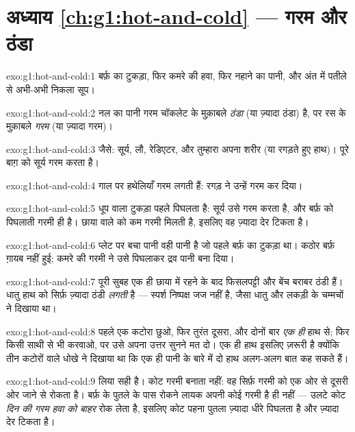 \section*{अध्याय \ref{ch:g1:hot-and-cold} --- गरम और ठंडा}

\begin{solution}{exo:g1:hot-and-cold:1}
बर्फ़ का टुकड़ा, फिर कमरे की हवा, फिर नहाने का पानी, और अंत में पतीले
से अभी-अभी निकला सूप।
\end{solution}

\begin{solution}{exo:g1:hot-and-cold:2}
नल का पानी गरम चॉकलेट के मुक़ाबले \emph{ठंडा} (या ज़्यादा ठंडा) है,
पर रस के मुक़ाबले \emph{गरम} (या ज़्यादा गरम)।
\end{solution}

\begin{solution}{exo:g1:hot-and-cold:3}
जैसे: सूर्य, लौ, रेडिएटर, और तुम्हारा अपना शरीर (या रगड़ते हुए हाथ)।
पूरे बाग़ को सूर्य गरम करता है।
\end{solution}

\begin{solution}{exo:g1:hot-and-cold:4}
गाल पर हथेलियाँ गरम लगती हैं: रगड़ ने उन्हें गरम कर दिया।
\end{solution}

\begin{solution}{exo:g1:hot-and-cold:5}
धूप वाला टुकड़ा पहले पिघलता है: सूर्य उसे गरम करता है, और बर्फ़ को
पिघलाती गरमी ही है। छाया वाले को कम गरमी मिलती है, इसलिए वह ज़्यादा
देर टिकता है।
\end{solution}

\begin{solution}{exo:g1:hot-and-cold:6}
प्लेट पर बचा पानी वही पानी है जो पहले बर्फ़ का टुकड़ा था। कठोर बर्फ़
ग़ायब नहीं हुई; कमरे की गरमी ने उसे पिघलाकर द्रव पानी बना दिया।
\end{solution}

\begin{solution}{exo:g1:hot-and-cold:7}
पूरी सुबह एक ही छाया में रहने के बाद फिसलपट्टी और बेंच बराबर ठंडी
हैं। धातु हाथ को सिर्फ़ ज़्यादा ठंडी \emph{लगती} है --- स्पर्श
निष्पक्ष जज नहीं है, जैसा धातु और लकड़ी के चम्मचों ने दिखाया था।
\end{solution}

\begin{solution}{exo:g1:hot-and-cold:8}
पहले एक कटोरा छुओ, फिर तुरंत दूसरा, और दोनों बार \emph{एक ही} हाथ से;
फिर किसी साथी से भी करवाओ, पर उसे अपना उत्तर सुनने मत दो। एक ही हाथ
इसलिए ज़रूरी है क्योंकि तीन कटोरों वाले धोखे ने दिखाया था कि एक ही
पानी के बारे में दो हाथ अलग-अलग बात कह सकते हैं।
\end{solution}

\begin{solution}{exo:g1:hot-and-cold:9}
लिया सही है। कोट गरमी बनाता नहीं: वह सिर्फ़ गरमी को एक ओर से दूसरी ओर
जाने से रोकता है। बर्फ़ के पुतले के पास रोकने लायक अपनी कोई गरमी है ही नहीं
--- उलटे कोट \emph{दिन की गरम हवा को बाहर} रोक लेता है, इसलिए कोट
पहना पुतला ज़्यादा धीरे पिघलता है और ज़्यादा देर टिकता है।
\end{solution}
